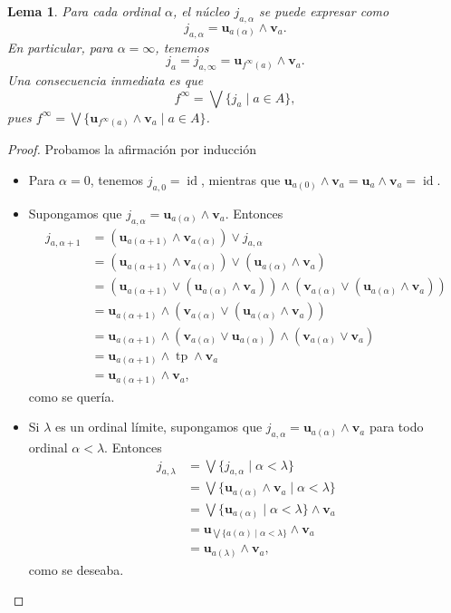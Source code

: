 \documentclass[12pt,letterpaper,titlepage]{article}
\newtheorem*{lemma}{Lema}
\theoremstyle{definition}
\renewcommand\sup{\vee}
\newcommand\Sup{\bigvee}
\renewcommand\inf{\wedge}
\newcommand\unuc[1]{\mathbf u_{#1}}
\newcommand\vnuc[1]{\mathbf v_{#1}}
\newcommand\<{\langle}
\renewcommand\>{\rangle}
\DeclareMathOperator{\id}{id}
\DeclareMathOperator{\tp}{tp}
\begin{document}
\begin{lemma}
  Para cada ordinal $\alpha$, el núcleo $j_{a,\alpha}$ se puede
  expresar como
  \[
    j_{a,\alpha} = \unuc{a(\alpha)} \inf \vnuc a
  .\]
  En particular, para $\alpha=\infty$, tenemos
  \[
    j_a = j_{a,\infty} = \unuc{f^\infty(a)}\inf\vnuc a
  .\]
  Una consecuencia inmediata es que
  \[
    f^\infty = \Sup\{j_a \mid a\in A\}
  ,\]
  pues
  $f^\infty = \Sup\{\unuc{f^\infty(a)}\inf\vnuc a \mid a\in A\}$.
\end{lemma}
\begin{proof}
  Probamos la afirmación por inducción
  \begin{itemize}
    \item Para $\alpha=0$, tenemos $j_{a,0}=\id$, mientras que
    $\unuc{a(0)}\inf \vnuc a = \unuc a \inf \vnuc a = \id$.
    \item Supongamos que
    $j_{a,\alpha} = \unuc{a(\alpha)} \inf \vnuc a$.
    Entonces
    \begin{align*}
      j_{a,\alpha+1}
      &= (\unuc {a(\alpha+1)}\inf \vnuc {a(\alpha)})
        \sup j_{a,\alpha} \\
      &= (\unuc {a(\alpha+1)}\inf \vnuc {a(\alpha)})
        \sup (\unuc{a(\alpha)} \inf \vnuc a) \\
      &=
      (\unuc {a(\alpha+1)}\sup (\unuc{a(\alpha)} \inf \vnuc a))
      \inf(\vnuc {a(\alpha)}\sup (\unuc{a(\alpha)} \inf \vnuc a)) \\
      &= \unuc {a(\alpha+1)}
      \inf(\vnuc {a(\alpha)}\sup (\unuc{a(\alpha)} \inf \vnuc a)) \\
      &= \unuc {a(\alpha+1)}
      \inf(\vnuc {a(\alpha)}\sup\unuc{a(\alpha)})
      \inf(\vnuc {a(\alpha)}\sup \vnuc a) \\
      &= \unuc {a(\alpha+1)} \inf \tp \inf \vnuc a \\
      &= \unuc {a(\alpha+1)}\inf \vnuc a,
    \end{align*}
    como se quería.
    \item Si $\lambda$ es un ordinal límite, supongamos que 
    $j_{a,\alpha} = \unuc{a(\alpha)} \inf \vnuc a$ para todo
    ordinal $\alpha <\lambda$.
    Entonces
    \begin{align*}
      j_{a,\lambda}
      &= \Sup\{j_{a,\alpha} \mid \alpha<\lambda\} \\
      &= \Sup\{\unuc{a(\alpha)}\inf\vnuc a \mid\alpha<\lambda\}
      \\
      &= \Sup\{\unuc{a(\alpha)}\mid\alpha<\lambda\}\inf\vnuc a \\
      &= \unuc{\Sup\{a(\alpha)\mid\alpha<\lambda\}}\inf\vnuc a \\
      &= \unuc{a(\lambda)}\inf\vnuc a,
    \end{align*}
    como se deseaba.
  \end{itemize}
\end{proof}
\end{document}
